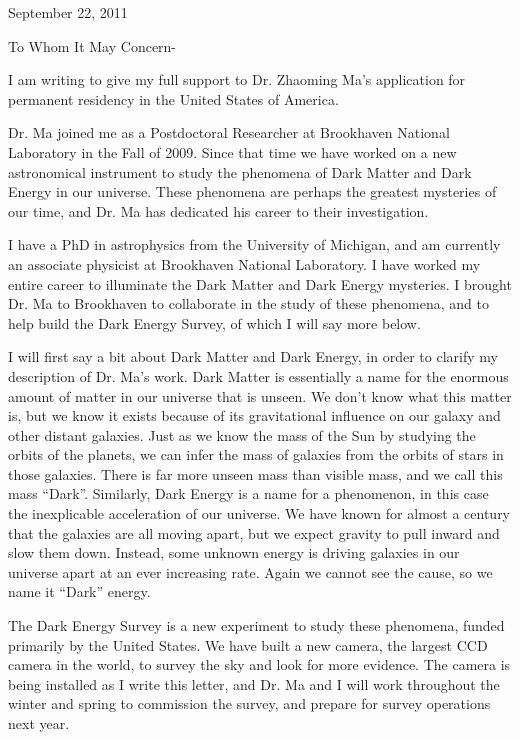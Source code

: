 \documentclass[12pt]{letter}
\begin{document}
\hfill September 22,  2011
\newline

To Whom It May Concern-

I am writing to give my full support to Dr. Zhaoming Ma's application for
permanent residency in the United States of America.

Dr. Ma joined me as a Postdoctoral Researcher at Brookhaven National Laboratory
in the Fall of 2009.  Since that time we have worked on a new astronomical
instrument to study the phenomena of Dark Matter and Dark Energy in our
universe.  These phenomena are perhaps the greatest mysteries of our time, and
Dr. Ma has dedicated his career to their investigation.

I have a PhD in astrophysics from the University of Michigan, and am currently
an associate physicist at Brookhaven National Laboratory.  I have worked my
entire career to illuminate the Dark Matter and Dark Energy mysteries.  I
brought Dr. Ma to Brookhaven to collaborate in the study of these phenomena,
and to help build the Dark Energy Survey, of which I will say more below.

I will first say a bit about Dark Matter and Dark Energy, in order to clarify
my description of Dr. Ma's work.  Dark Matter is essentially a name for the
enormous amount of matter in our universe that is unseen.  We don't know what
this matter is, but we know it exists because of its gravitational influence on
our galaxy and other distant galaxies.  Just as we know the mass of the Sun by
studying the orbits of the planets, we can infer the mass of galaxies from the
orbits of stars in those galaxies.  There is far more unseen mass than visible
mass, and we call this mass ``Dark''.  Similarly, Dark Energy is a name for a
phenomenon, in this case the inexplicable acceleration of our universe. We have
known for almost a century that the galaxies are all moving apart, but we
expect gravity to pull inward and slow them down.  Instead, some unknown energy
is driving galaxies in our universe apart at an ever increasing rate.  Again
we cannot see the cause, so we name it ``Dark'' energy.

The Dark Energy Survey is a new experiment to study these phenomena, funded
primarily by the United States.  We have built a new camera, the largest CCD
camera in the world, to survey the sky and look for more evidence.  The camera
is being installed as I write this letter, and Dr. Ma and I will work
throughout the winter and spring to commission the survey, and prepare for
survey operations next year.
\end{document}
